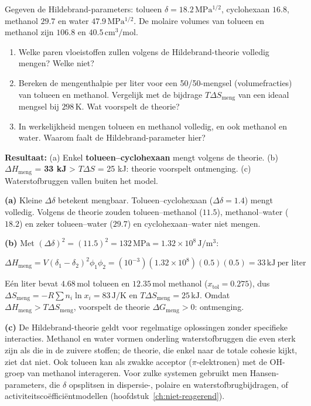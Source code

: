 \begin{oefening}
Gegeven de Hildebrand-parameters: tolueen \(\delta = 18.2\,\mathrm{MPa^{1/2}}\), cyclohexaan \(16.8\), methanol \(29.7\) en water \(47.9\,\mathrm{MPa^{1/2}}\). De molaire volumes van tolueen en methanol zijn \(106.8\) en \(40.5\,\mathrm{cm^3/mol}\).

\begin{enumerate}
\item[(a)]
  Welke paren vloeistoffen zullen volgens de Hildebrand-theorie volledig mengen? Welke niet?
\item[(b)]
  Bereken de mengenthalpie per liter voor een 50/50-mengsel (volumefracties) van tolueen en methanol. Vergelijk met de bijdrage \(T\Delta S_{\text{meng}}\) van een ideaal mengsel bij \(298\,\mathrm{K}\). Wat voorspelt de theorie?
\item[(c)]
  In werkelijkheid mengen tolueen en methanol volledig, en ook methanol en water. Waarom faalt de Hildebrand-parameter hier?
\end{enumerate}
\end{oefening}
\begin{oplossing}
\textbf{Resultaat:} (a) Enkel \textbf{tolueen--cyclohexaan} mengt volgens de theorie. (b) \(\Delta H_{\text{meng}}\) = \textbf{33 kJ} \textgreater{} \(T\Delta S\) = 25 kJ: theorie voorspelt ontmenging. (c) Waterstofbruggen vallen buiten het model.

\textbf{(a)} Kleine \(\Delta\delta\) betekent mengbaar. Tolueen--cyclohexaan (\(\Delta\delta = 1.4\)) mengt volledig. Volgens de theorie zouden tolueen--methanol (\(11.5\)), methanol--water (\(18.2\)) en zeker tolueen--water (\(29.7\)) en cyclohexaan--water niet mengen.

\textbf{(b)} Met \((\Delta\delta)^2 = (11.5)^2 = 132\,\mathrm{MPa} = 1.32\times10^{8}\,\mathrm{J/m^3}\):

\[
\Delta H_{\text{meng}} = V(\delta_1 - \delta_2)^2\phi_1\phi_2 = (10^{-3})(1.32\times10^{8})(0.5)(0.5) = 33\,\mathrm{kJ}\ \text{per liter}
\]

Eén liter bevat \(4.68\,\mathrm{mol}\) tolueen en \(12.35\,\mathrm{mol}\) methanol (\(x_{\text{tol}} = 0.275\)), dus \(\Delta S_{\text{meng}} = -R\sum n_i\ln x_i = 83\,\mathrm{J/K}\) en \(T\Delta S_{\text{meng}} = 25\,\mathrm{kJ}\). Omdat \(\Delta H_{\text{meng}} > T\Delta S_{\text{meng}}\), voorspelt de theorie \(\Delta G_{\text{meng}} > 0\): ontmenging.

\textbf{(c)} De Hildebrand-theorie geldt voor regelmatige oplossingen zonder specifieke interacties. Methanol en water vormen onderling waterstofbruggen die even sterk zijn als die in de zuivere stoffen; de theorie, die enkel naar de totale cohesie kijkt, ziet dat niet. Ook tolueen kan als zwakke acceptor (\ensuremath{\pi{}}-elektronen) met de OH-groep van methanol interageren. Voor zulke systemen gebruikt men Hansen-parameters, die \(\delta\) opsplitsen in dispersie-, polaire en waterstofbrugbijdragen, of activiteitscoëfficiëntmodellen (hoofdstuk~\ref{ch:niet-reagerend}).
\end{oplossing}

